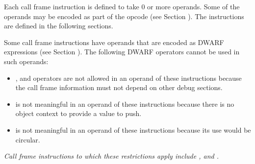 Each call frame instruction is defined to take 0 or more
operands. Some of the operands may be encoded as part of the
opcode 
(see Section ). 
The instructions are defined in
the following sections.

Some call frame instructions have operands that are encoded
as DWARF expressions 
(see Section ). 
The following DWARF
operators cannot be used in such operands:


\begin{itemize}
\item \DWOPcalltwo, \DWOPcallfour{} 
and \DWOPcallref{} operators are 
not allowed in an operand of these instructions because
the call frame information must not depend on other
debug sections.

\item \DWOPpushobjectaddress{} is not meaningful in an operand
of these instructions because there is no object context to
provide a value to push.

\item \DWOPcallframecfa{} is not meaningful in an operand of
these instructions because its use would be circular.
\end{itemize}

\textit{Call frame instructions to which these restrictions apply
include \DWCFAdefcfaexpression, \DWCFAexpression{}
and \DWCFAvalexpression.}

